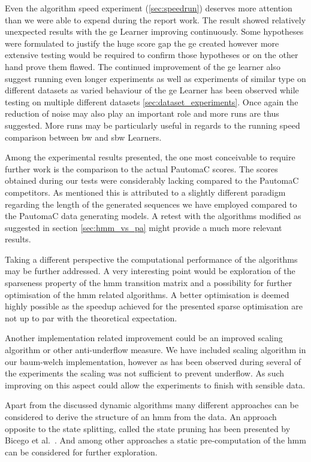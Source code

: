 Even the algorithm speed experiment (\ref{sec:speedrun}) deserves more attention than we were able to expend during the report work. The result showed relatively unexpected results with the \gls{ge} Learner improving continuously. Some hypotheses were formulated to justify the huge score gap the \gls{ge} created however more extensive testing would be required to confirm those hypotheses or on the other hand prove them flawed. The continued improvement of the \gls{ge} learner also suggest running even longer experiments as well as experiments of similar type on different datasets as varied behaviour of the \gls{ge} Learner has been observed while testing on multiple different datasets \ref{sec:dataset_experiments}. Once again the reduction of noise may also play an important role and more runs are thus suggested. More runs may be particularly useful in regards to the running speed comparison between \acrlong{bw} and \acrlong{sbw} Learners.

Among the experimental results presented, the one most conceivable to require further work is the comparison to the actual PautomaC scores. The scores obtained during our tests were considerably lacking compared to the PautomaC competitors. As mentioned this is attributed to a slightly different paradigm regarding the length of the generated sequences we have employed compared to the PautomaC data generating models. A retest with the algorithms modified as suggested in section \ref{sec:hmm_vs_pa} might provide a much more relevant results.

Taking a different perspective the computational performance of the algorithms may be further addressed. A very interesting point would be exploration of the sparseness property of the \gls{hmm} transition matrix and a possibility for further optimisation of the \gls{hmm} related algorithms. A better optimisation is deemed highly possible as the speedup achieved for the presented sparse optimisation are not up to par with the theoretical expectation.

Another implementation related improvement could be an improved scaling algorithm or other anti-underflow measure. We have included scaling algorithm in our \gls{baum-welch} implementation, however as has been observed during several of the experiments the scaling was not sufficient to prevent underflow. As such improving on this aspect could allow the experiments to finish with sensible data.

Apart from the discussed dynamic algorithms many different approaches can be considered to derive the structure of an \gls{hmm} from the data. An approach opposite to the state splitting, called the state pruning has been presented by Bicego et al.~\cite{bicego2003}. And among other approaches a static pre-computation of the \gls{hmm} can be considered for further exploration.


